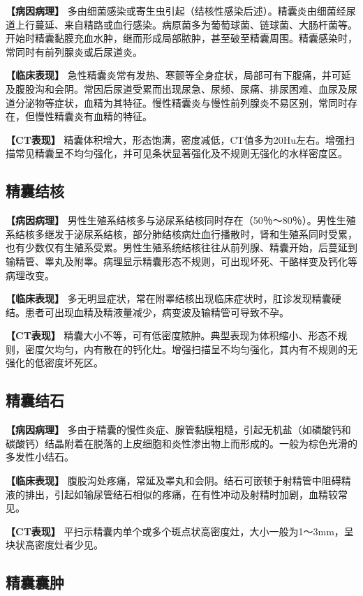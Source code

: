 \textbf{【病因病理】}
多由细菌感染或寄生虫引起（结核性感染后述）。精囊炎由细菌经尿道上行蔓延、来自精路或血行感染。病原菌多为葡萄球菌、链球菌、大肠杆菌等。开始时精囊黏膜充血水肿，继而形成局部脓肿，甚至破至精囊周围。精囊感染时，常同时有前列腺炎或后尿道炎。

\textbf{【临床表现】}
急性精囊炎常有发热、寒颤等全身症状，局部可有下腹痛，并可延及腹股沟和会阴。常因后尿道受累而出现尿急、尿频、尿痛、排尿困难、血尿及尿道分泌物等症状，血精为其特征。慢性精囊炎与慢性前列腺炎不易区别，常同时存在，但慢性精囊炎有血精的特征。

\textbf{【CT表现】}
精囊体积增大，形态饱满，密度减低，CT值多为20Hu左右。增强扫描常见精囊呈不均匀强化，并可见条状显著强化及不规则无强化的水样密度区。

\subsection{精囊结核}

\textbf{【病因病理】}
男性生殖系结核多与泌尿系结核同时存在（50％～80％）。男性生殖系结核多继发于泌尿系结核，部分肺结核病灶血行播散时，肾和生殖系同时受累，也有少数仅有生殖系受累。男性生殖系统结核往往从前列腺、精囊开始，后蔓延到输精管、睾丸及附睾。病理显示精囊形态不规则，可出现坏死、干酪样变及钙化等病理改变。

\textbf{【临床表现】}
多无明显症状，常在附睾结核出现临床症状时，肛诊发现精囊硬结。患者可出现血精及精液量减少，病变波及输精管可导致不孕。

\textbf{【CT表现】}
精囊大小不等，可有低密度脓肿。典型表现为体积缩小、形态不规则，密度欠均匀，内有散在的钙化灶。增强扫描呈不均匀强化，其内有不规则的无强化的低密度坏死区。

\subsection{精囊结石}

\textbf{【病因病理】}
多由于精囊的慢性炎症、腺管黏膜粗糙，引起无机盐（如磷酸钙和碳酸钙）结晶附着在脱落的上皮细胞和炎性渗出物上而形成的。一般为棕色光滑的多发性小结石。

\textbf{【临床表现】}
腹股沟处疼痛，常延及睾丸和会阴。结石可嵌顿于射精管中阻碍精液的排出，引起如输尿管结石相似的疼痛，在有性冲动及射精时加剧，血精较常见。

\textbf{【CT表现】}
平扫示精囊内单个或多个斑点状高密度灶，大小一般为1～3mm，呈块状高密度灶者少见。

\subsection{精囊囊肿}

